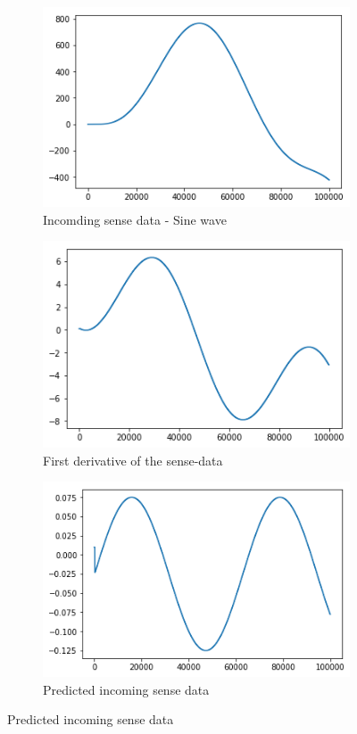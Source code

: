 \begin{figure}[H]
\centering
\begin{subfigure}{.3\linewidth}
    \centering
    \includegraphics[scale=0.35]{chapter_3_figures/fc_phi.png}
    \caption{Incomding sense data - Sine wave}
\end{subfigure}
    \hfill
\begin{subfigure}{.3\linewidth}
    \centering
    \includegraphics[scale=0.35]{chapter_3_figures/fc_phidot.png}
    \caption{First derivative of the sense-data}
\end{subfigure}
\hfill
\begin{subfigure}{.3\linewidth}
    \centering
    \includegraphics[scale=0.35]{chapter_3_figures/fc_phidotdot.png}
    \caption{Predicted incoming sense data}
\end{subfigure}
\bigskip


\end{figure}
